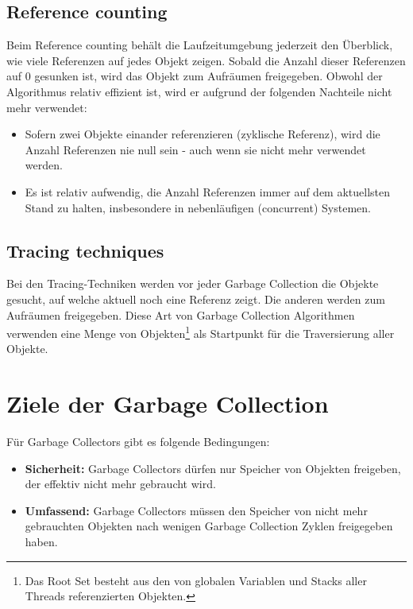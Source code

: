 \subsection{Reference counting}
Beim Reference counting\cite[S. 77]{lagergren2010oracle} behält die Laufzeitumgebung jederzeit den Überblick, wie viele Referenzen auf jedes Objekt zeigen. Sobald die Anzahl dieser Referenzen auf 0 gesunken ist, wird das Objekt zum Aufräumen freigegeben. Obwohl der Algorithmus relativ effizient ist, wird er aufgrund der folgenden Nachteile nicht mehr verwendet:
\begin{itemize}
	\item Sofern zwei Objekte einander referenzieren (zyklische Referenz), wird die Anzahl Referenzen nie null sein - auch wenn sie nicht mehr verwendet werden.
	\item Es ist relativ aufwendig, die Anzahl Referenzen immer auf dem aktuellsten Stand zu halten, insbesondere in nebenläufigen (concurrent) Systemen.
\end{itemize}
\subsection{Tracing techniques}
Bei den Tracing-Techniken\cite[S. 77]{lagergren2010oracle} werden vor jeder Garbage Collection die Objekte gesucht, auf welche aktuell noch eine Referenz zeigt. Die anderen werden zum Aufräumen freigegeben. Diese Art von Garbage Collection Algorithmen verwenden eine Menge von Objekten\footnote{Das Root Set besteht aus den von globalen Variablen und Stacks aller Threads referenzierten Objekten.} als Startpunkt für die Traversierung aller Objekte.

\section{Ziele der Garbage Collection}
Für Garbage Collectors gibt es folgende Bedingungen\cite[S. 4]{sunMemoryManagementWP}:
\begin{itemize}
	\item \textbf{Sicherheit:} Garbage Collectors dürfen nur Speicher von Objekten freigeben, der effektiv nicht mehr gebraucht wird.
	\item \textbf{Umfassend:} Garbage Collectors müssen den Speicher von nicht mehr gebrauchten Objekten nach wenigen Garbage Collection Zyklen freigegeben haben.
\end{itemize}

